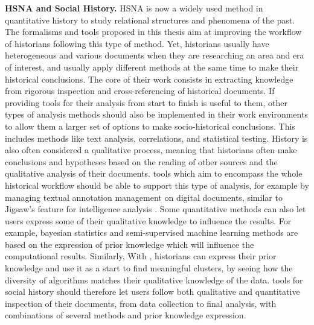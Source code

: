 \noindent\textbf{HSNA and Social History.} HSNA is now a widely used method in quantitative history to study relational structures and phenomena of the past\cite{kerschbaumerPowerNetworksProspects2015, petzCombiningNetworkResearch2022, wetherellHistoricalSocialNetwork1998}. The formalisms and tools proposed in this thesis aim at improving the workflow of historians following this type of method.
Yet, historians usually have heterogeneous and various documents when they are researching an area and era of interest, and usually apply different methods at the same time to make their historical conclusions\cite{padgettRobustActionRise1993, petzCombiningNetworkResearch2022}.
The core of their work consists in extracting knowledge from rigorous inspection and cross-referencing of historical documents.
If providing \va tools for their \hsna analysis from start to finish is useful to them, other types of analysis methods should also be implemented in their work environments to allow them a larger set of options to make socio-historical conclusions.
This includes methods like text analysis, correlations, and statistical testing\cite{lemercierQuantitativeMethodsHumanities2019}.
History is also often considered a qualitative process, meaning that historians often make conclusions and hypotheses based on the reading of other sources and the qualitative analysis of their documents.
\va tools which aim to encompass the whole historical workflow should be able to support this type of analysis, for example by managing textual annotation management on digital documents, similar to Jigsaw's feature for intelligence analysis \cite{staskoJigsawSupportingInvestigative2008}.
Some quantitative methods can also let users express some of their qualitative knowledge to influence the results.
For example, bayesian statistics and semi-supervised machine learning methods are based on the expression of prior knowledge which will influence the computational results.
Similarly, With \pkclustering, historians can express their prior knowledge and use it as a start to find meaningful clusters, by seeing how the diversity of algorithms matches their qualitative knowledge of the data.
\va tools for social history should therefore let users follow both qualitative and quantitative inspection of their documents, from data collection to final analysis, with combinations of several methods and prior knowledge expression.


